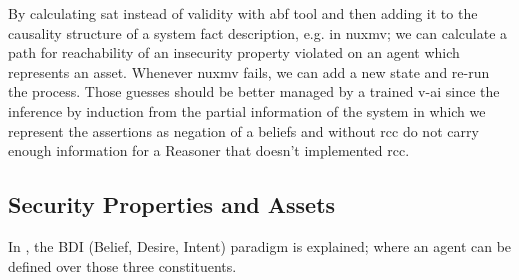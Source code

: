{By calculating sat instead of validity with abf tool and then adding it to the
causality structure of a system fact description, e.g. in nuxmv; we can
calculate a path for reachability of an insecurity property violated on an
agent which represents an asset. Whenever nuxmv fails, we can add a new state
and re-run the process. Those guesses should be better managed by a trained
v-ai since the inference by induction from the partial information of the
system in which we represent the assertions as negation of a beliefs and
without rcc do not carry enough information for a Reasoner that doesn't
implemented rcc.
}

\subsection{Security Properties and Assets}\label{sec:properties}
In \autocite{Georgeoff1995bdi}, the BDI (Belief, Desire, Intent)
paradigm is explained; where an agent can be defined over those
three constituents.
